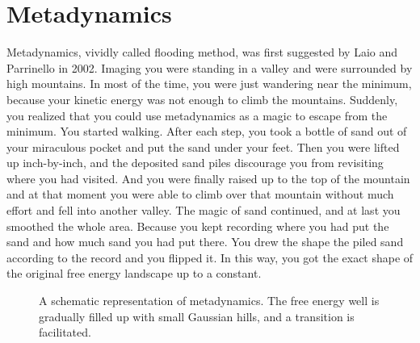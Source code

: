 \section{Metadynamics\label{Sec:ES:metadynamics}}
Metadynamics, vividly called flooding method, was first suggested by Laio and Parrinello in 2002.\cite{LaioPNAS2002} 
Imaging you were standing in a valley and were surrounded by high mountains. In most of the time, you were just wandering near the minimum, because your kinetic energy was not enough to climb the mountains. Suddenly, you realized that you could use metadynamics as a magic to escape from the minimum. You started walking. After each step, you took a bottle of sand out of your miraculous pocket and put the sand under your feet. Then you were lifted up inch-by-inch, and the deposited sand piles discourage you from revisiting where you had visited. And you were finally raised up to the top of the mountain and at that moment you were able to climb over that mountain without much effort and fell into another valley. The magic of sand continued, and at last you smoothed the whole area. Because you kept recording where you had put the sand and how much sand you had put there. You drew the shape the piled sand according to the record and you flipped it. In this way, you got the exact shape of the original free energy landscape up to a constant. 
\begin{figure}[htbp]
	\centering
	\caption{A schematic representation of metadynamics. The free energy well is gradually filled up with small Gaussian hills, and a transition is facilitated.}\label{Fig:ES:metadynamics}
\end{figure}

